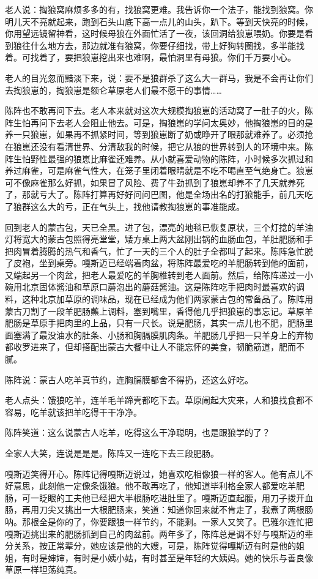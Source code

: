 \par 老人说：掏狼窝麻烦多多的有，找狼窝更难。我告诉你一个法子，能找到狼窝。你明儿天不亮就起来，跑到石头山底下高一点儿的山头，趴下。等到天快亮的时候，你用望远镜留神看，这时候母狼在外面忙活了一夜，该回洞给狼崽喂奶。你要是看到狼往什么地方去，那边就准有狼窝，你要仔细找，带上好狗转圈找，多半能找着。可找着了，要把狼崽挖出来也难啊，最怕洞里有母狼。你们千万要小心。
\par 老人的目光忽而黯淡下来，说：要不是狼群杀了这么大一群马，我是不会再让你们去掏狼崽的，掏狼崽是额仑草原老人们最不愿干的事情……
\par 陈阵也不敢再问下去。老人本来就对这次大规模掏狼崽的活动窝了一肚子的火，陈阵生怕再问下去老人会阻止他去。可是，掏狼崽的学问太奥妙，他掏狼崽的目的是养一只狼崽，如果再不抓紧时间，等到狼崽断了奶或睁开了眼那就难养了。必须抢在狼崽还没有看清世界、分清敌我的时候，把它从狼的世界转到人的环境中来。陈阵生怕野性最强的狼崽比麻雀还难养。从小就喜爱动物的陈阵，小时候多次抓过和养过麻雀，可是麻雀气性大，在笼子里闭着眼睛就是不吃不喝直至气绝身亡。狼崽可不像麻雀那么好抓，如果冒了风险、费了牛劲抓到了狼崽却养不了几天就养死了，那就亏大了。陈阵打算再好好问问巴图，他是全场出名的打狼能手，前几天吃了狼群这么大的亏，正在气头上，找他请教掏狼崽的事准能成。
\par 回到老人的蒙古包，天已全黑。进了包，漂亮的地毯已恢复原状，三个灯捻的羊油灯将宽大的蒙古包照得亮堂堂，矮方桌上两大盆刚出锅的血肠血包，羊肚肥肠和手把肉冒着腾腾的热气和香气，忙了一天的三个人的肚子全都叫了起来。陈阵急忙脱了皮袍，坐到桌旁。嘎斯迈已经端着肉盆，将陈阵最爱吃的羊肥肠转到他的面前，又端起另一个肉盆，把老人最爱吃的羊胸椎转到老人面前。然后，给陈阵递过一小碗用北京固体酱油和草原口蘑泡出的蘑菇酱油。这是陈阵吃手把肉时最喜欢的调料，这种北京加草原的调味品，现在已经成为他们两家蒙古包的常备品了。陈阵用蒙古刀割了一段羊肥肠蘸上调料，塞到嘴里，香得他几乎把狼崽的事忘记。草原羊肥肠是草原手把肉里的上品，只有一尺长。说是肥肠，其实一点儿也不肥，肥肠里面塞满了最没油水的肚条、小肠和胸膈膜肌肉条。羊肥肠几乎把一只羊身上的弃物都收罗进来了，但却搭配出蒙古大餐中让人不能忘怀的美食，韧脆筋道，肥而不腻。
\par 陈阵说：蒙古人吃羊真节约，连胸膈膜都舍不得扔，还这么好吃。
\par 老人点头：饿狼吃羊，连羊毛羊蹄壳都吃下去。草原闹起大灾来，人和狼找食都不容易，吃羊就该把羊吃得干干净净。
\par 陈阵笑道：这么说蒙古人吃羊，吃得这么干净聪明，也是跟狼学的了？
\par 全家人大笑，连说是是是。陈阵又一连吃下去三段肥肠。
\par 嘎斯迈笑得开心。陈阵记得嘎斯迈说过，她喜欢吃相像狼一样的客人。他有点儿不好意思，此刻他一定像条饿狼。他不敢再吃了，他知道毕利格全家人都爱吃羊肥肠，可一眨眼的工夫他已经把大半根肠吃进肚里了。嘎斯迈直起腰，用刀子拨开血肠，再用刀尖又挑出一大根肥肠来，笑道：知道你回来就不肯走了，我煮了两根肠呐。那根全是你的了，你要跟狼一样节约，不能剩。一家人又笑了。巴雅尔连忙把嘎斯迈挑出来的肥肠抓到自己的肉盆前。两年多了，陈阵总是调不好与嘎斯迈的辈分关系，按正常辈分，她应该是他的大嫂，可是，陈阵觉得嘎斯迈有时是他的姐姐，有时是婶婶，有时是小姨小姑，有时甚至是年轻的大姨妈。她的快乐与善良像草原一样坦荡纯真。
